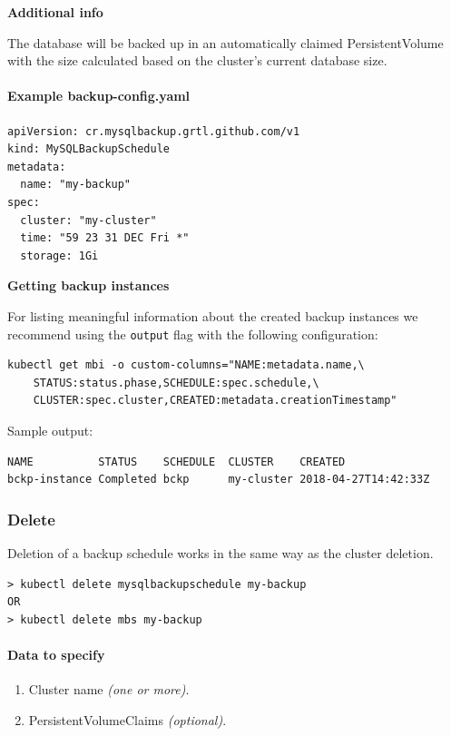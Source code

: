 \noindent  \textbf{Additional info}

\noindent The database will be backed up in an automatically claimed PersistentVolume with the size
calculated based on the cluster's current database size.

\paragraph{Example \textbf{backup-config.yaml}}
\begin{lstlisting}[caption=backup-config.yaml,captionpos=b]
apiVersion: cr.mysqlbackup.grtl.github.com/v1
kind: MySQLBackupSchedule
metadata:
  name: "my-backup"
spec:
  cluster: "my-cluster"
  time: "59 23 31 DEC Fri *"
  storage: 1Gi
\end{lstlisting}

\noindent  \textbf{Getting backup instances}

\noindent For listing meaningful information about the created backup instances we recommend
using the \texttt{output} flag with the following configuration:

\begin{lstlisting}
kubectl get mbi -o custom-columns="NAME:metadata.name,\
	STATUS:status.phase,SCHEDULE:spec.schedule,\
	CLUSTER:spec.cluster,CREATED:metadata.creationTimestamp"
\end{lstlisting}

\noindent Sample output:
\begin{lstlisting}
NAME          STATUS    SCHEDULE  CLUSTER    CREATED
bckp-instance Completed bckp      my-cluster 2018-04-27T14:42:33Z
\end{lstlisting}

\subsubsection*{Delete}

Deletion of a backup schedule works in the same way as the cluster deletion.

\begin{lstlisting}
> kubectl delete mysqlbackupschedule my-backup
OR
> kubectl delete mbs my-backup
\end{lstlisting}

\paragraph{Data to specify}
\begin{enumerate}
	\item Cluster name \textit{(one or more)}.
	\item PersistentVolumeClaims \textit{(optional)}.
\end{enumerate}

